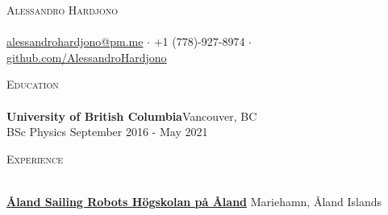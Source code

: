 \documentclass[a4paper]{article}
\newcommand{\lineunder} {
    \vspace*{-8pt} \\
    \hspace*{-18pt} \hrulefill \\
}
\newcommand{\header} [1] {
    {\hspace*{-18pt}\vspace*{6pt} \textsc{#1}}
    \vspace*{-6pt} \lineunder
}
\begin{document}
\vspace*{-0pt}

    


\vspace*{-4pt}
\begin{center}
	{\Huge \scshape {Alessandro Hardjono}}\\ 
	\\
	\href{mailto:alessandrohardjono@pm.me}{alessandrohardjono@pm.me} $\cdot$
	+1 (778)-927-8974 $\cdot$
	\href{https://www.github.com/AlessandroHardjono}{github.com/AlessandroHardjono} \\
\end{center}

\header{Education}
\textbf{University of British Columbia}\hfill Vancouver, BC\\
BSc Physics \hfill September 2016 - May 2021\\
\vspace{2mm}

\header{Experience}
\vspace{1mm}

\textbf{\href{https://sailingrobots.ax/}{Åland Sailing Robots \textbar{} Högskolan på Åland}} \hfill Mariehamn, Åland Islands\\
\end{document}
